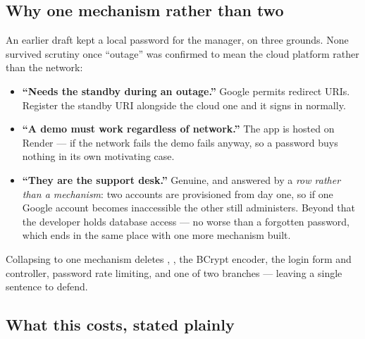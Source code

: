 \documentclass[10pt,a4paper]{article}
\begin{document}

\subsection{Why one mechanism rather than two}

An earlier draft kept a local password for the manager, on three grounds. None survived scrutiny
once ``outage'' was confirmed to mean the cloud platform rather than the network:

\begin{itemize}
  \item \textbf{``Needs the standby during an outage.''} Google permits 
        redirect URIs. Register the standby URI alongside the cloud one and it signs in normally.
  \item \textbf{``A demo must work regardless of network.''} The app is hosted on Render --- if the
        network fails the demo fails anyway, so a password buys nothing in its own motivating case.
  \item \textbf{``They are the support desk.''} Genuine, and answered by a \emph{row rather than a
        mechanism}: two  accounts are provisioned from day one, so if one Google
        account becomes inaccessible the other still administers. Beyond that the developer holds
        database access --- no worse than a forgotten password, which ends in the same place with
        one more mechanism built.
\end{itemize}

Collapsing to one mechanism deletes , , the BCrypt encoder, the
login form and controller, password rate limiting, and one of two 
branches --- leaving a single sentence to defend.

\subsection{What this costs, stated plainly}
\end{document}
